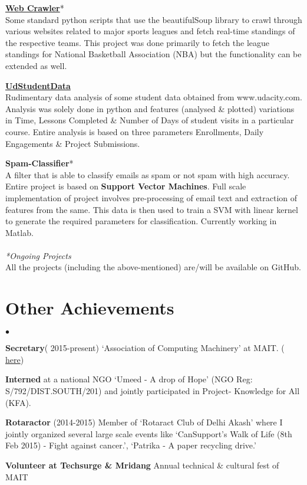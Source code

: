 \documentclass[margin,line]{res}
\newenvironment{list2}{
  \begin{list}{$\bullet$}{%
      \setlength{\itemsep}{0in}
      \setlength{\parsep}{0in} \setlength{\parskip}{0in}
      \setlength{\topsep}{0in} \setlength{\partopsep}{0in}
      \setlength{\leftmargin}{0.2in}}}{\end{list}}
\begin{document}
\begin{resume}
{\bf {\href{https://github.com/sominwadhwa/WebCrawlers}{\color{blue} Web Crawler}}}*\\
Some standard python scripts that use the beautifulSoup library to crawl through various websites related to major
sports leagues and fetch real-time standings of the respective teams. This project was done primarily to fetch the 
league standings for National Basketball Association (NBA) but the functionality can be extended as well.


{\bf {\href{https://github.com/sominwadhwa/UdStudentData}{\color{blue} UdStudentData}}}\\
Rudimentary data analysis of some student data obtained from www.udacity.com. Analysis was solely done in python and
features (analysed \& plotted) variations in Time, Lessons Completed \& Number of Days of student visits in a particular course. Entire analysis is based on three parameters\- Enrollments, Daily Engagements \& Project Submissions.


{\bf Spam-Classifier}*\\
A filter that is able to classify emails as spam or not spam with high accuracy. Entire project is based on {\bf Support Vector Machines}. Full scale implementation of project involves pre-processing of email text and extraction of features from the same. This data is then used to train a SVM with linear kernel to generate the required parameters for classification. Currently working in Matlab.\\
\\ \textit{*Ongoing Projects}
\\ All the projects (including the above-mentioned) are/will be available on GitHub.


\section{\sc Other Achievements}
\begin{list2}

\item {\bf Secretary}( 2015-present)  `Association of Computing Machinery' at MAIT. ({\href{https://mait.acm.org/team.html}{\color{blue} here}})
\item {\bf Interned} at a national NGO `Umeed - A drop of Hope' (NGO Reg: S/792/DIST.SOUTH/201) and jointly participated in Project- Knowledge for All (KFA).
\item {\bf Rotaractor} (2014-2015) Member of `Rotaract Club of Delhi Akash' where I jointly organized
several large scale events like `CanSupport's Walk of Life (8th Feb 2015) - Fight against cancer.', 
`Patrika - A paper recycling drive.'
\item {\bf Volunteer at Techsurge \& Mridang} Annual technical \& cultural fest of MAIT


\end{list2}
\end{resume}
\end{document}
